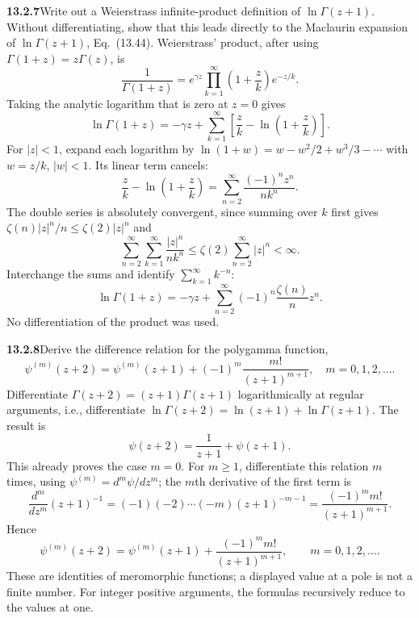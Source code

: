 \par\bigskip
\noindent\textbf{13.2.7}\quad Write out a Weierstrass infinite-product
definition of $\ln\Gamma(z+1)$. Without differentiating, show that this leads
directly to the Maclaurin expansion of $\ln\Gamma(z+1)$, Eq.~(13.44).
\solution
Weierstrass' product, after using $\Gamma(1+z)=z\Gamma(z)$, is
\[
\frac1{\Gamma(1+z)}=e^{\gamma z}
\prod_{k=1}^{\infty}\left(1+\frac zk\right)e^{-z/k}.
\]
Taking the analytic logarithm that is zero at $z=0$ gives
\[
\ln\Gamma(1+z)=-\gamma z+
\sum_{k=1}^{\infty}\left[\frac zk-\ln\left(1+\frac zk\right)\right].
\]
For $|z|<1$, expand each logarithm by
$\ln(1+w)=w-w^2/2+w^3/3-\cdots$ with $w=z/k$, $|w|<1$.  Its linear
term cancels:
\[
\frac zk-\ln\left(1+\frac zk\right)
=\sum_{n=2}^{\infty}\frac{(-1)^n z^n}{n k^n}.
\]
The double series is absolutely convergent, since summing over $k$
first gives $\zeta(n)|z|^n/n\le\zeta(2)|z|^n$ and
\[
\sum_{n=2}^{\infty}\sum_{k=1}^{\infty}
\frac{|z|^n}{n k^n}
\le\zeta(2)\sum_{n=2}^{\infty}|z|^n<\infty.
\]
Interchange the sums and identify $\sum_{k=1}^\infty k^{-n}$:
\[
\boxed{\ln\Gamma(1+z)=-\gamma z+
\sum_{n=2}^{\infty}(-1)^n\frac{\zeta(n)}n z^n}.
\]
No differentiation of the product was used.


\par\bigskip
\noindent\textbf{13.2.8}\quad Derive the difference relation for the
polygamma function,
\[
\psi^{(m)}(z+2)=\psi^{(m)}(z+1)+(-1)^{m}\frac{m!}{(z+1)^{m+1}},
\quad m=0,1,2,\ldots.
\]
\solution
Differentiate $\Gamma(z+2)=(z+1)\Gamma(z+1)$ logarithmically
at regular arguments, i.e., differentiate
$\ln\Gamma(z+2)=\ln(z+1)+\ln\Gamma(z+1)$.  The result is
\[
\psi(z+2)=\frac1{z+1}+\psi(z+1).
\]
This already proves the case $m=0$.  For $m\ge1$, differentiate
this relation $m$ times, using $\psi^{(m)}=d^m\psi/dz^m$; the $m$th
derivative of the first term is
\[
\frac{d^m}{dz^m}(z+1)^{-1}
=(-1)(-2)\cdots(-m)(z+1)^{-m-1}
=\frac{(-1)^m m!}{(z+1)^{m+1}}.
\]
Hence
\[
\boxed{\psi^{(m)}(z+2)=\psi^{(m)}(z+1)
+\frac{(-1)^m m!}{(z+1)^{m+1}}},\qquad m=0,1,2,\ldots.
\]
These are identities of meromorphic functions; a displayed value
at a pole is not a finite number.  For integer positive arguments,
the formulas recursively reduce to the values at one.


